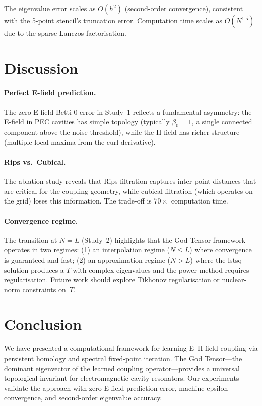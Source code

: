 \documentclass[11pt,twocolumn]{article}
\begin{document}
The eigenvalue error scales as $O(h^2)$ (second-order convergence),
consistent with the 5-point stencil's truncation error.  Computation
time scales as $O(N^{1.5})$ due to the sparse Lanczos factorisation.

\section{Discussion}
\label{sec:discussion}

\paragraph{Perfect E-field prediction.}
The zero E-field Betti-0 error in Study~1 reflects a fundamental
asymmetry: the E-field in PEC cavities has simple topology (typically
$\beta_0 = 1$, a single connected component above the noise threshold),
while the H-field has richer structure (multiple local maxima from the
curl derivative).

\paragraph{Rips vs.\ Cubical.}
The ablation study reveals that Rips filtration captures inter-point
distances that are critical for the coupling geometry, while cubical
filtration (which operates on the grid) loses this information.  The
trade-off is $70\times$ computation time.

\paragraph{Convergence regime.}
The transition at $N = L$ (Study~2) highlights that the God Tensor
framework operates in two regimes: (1) an interpolation regime
($N \leq L$) where convergence is guaranteed and fast; (2) an
approximation regime ($N > L$) where the lstsq solution produces a
$T$ with complex eigenvalues and the power method requires
regularisation.  Future work should explore Tikhonov regularisation
or nuclear-norm constraints on~$T$.

\section{Conclusion}

We have presented a computational framework for learning E--H field
coupling via persistent homology and spectral fixed-point iteration.
The God Tensor---the dominant eigenvector of the learned coupling
operator---provides a universal topological invariant for electromagnetic
cavity resonators.  Our experiments validate the approach with zero
E-field prediction error, machine-epsilon convergence, and
second-order eigenvalue accuracy.
\end{document}
